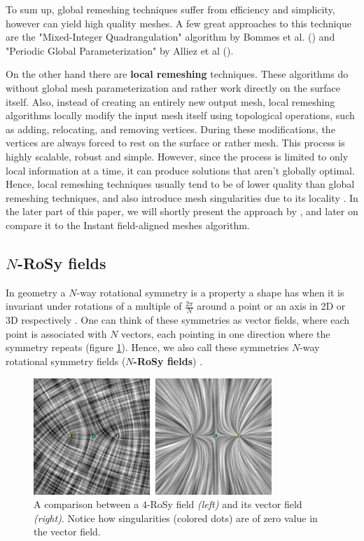 \documentclass{ACGSeminar}
\begin{document}
To sum up, global remeshing techniques suffer from efficiency and simplicity, however can yield high quality meshes. A few great approaches to this technique are the "Mixed-Integer Quadrangulation" algorithm by Bommes et al. (\cite{bommes2009mixed}) and "Periodic Global Parameterization" by Alliez et al (\cite{ray2006periodic}).\bigskip

On the other hand there are \textbf{local remeshing} techniques. These algorithms do without global mesh parameterization and rather work directly on the surface itself. Also, instead of creating an entirely new output mesh, local remeshing algorithms locally modify the input mesh itself using topological operations, such as adding, relocating, and removing vertices. During these modifications, the vertices are always forced to rest on the surface or rather mesh. This process is highly scalable, robust and simple. However, since the process is limited to only local information at a time, it can produce solutions that aren't globally optimal. Hence, local remeshing techniques usually tend to be of lower quality than global remeshing techniques, and also introduce mesh singularities due to its locality \cite{jakob2015instant,alliez2008recent}. In the later part of this paper, we will shortly present the approach by \cite{tarini2010practical}, and later on compare it to the Instant field-aligned meshes algorithm.


\subsection{$N$-RoSy fields}\label{rosy}
In geometry a $N$-way rotational symmetry is a property a shape has when it is invariant under rotations of a multiple of $\frac{2\pi}{N}$ around a point or an axis in 2D or 3D respectively \cite{palacios2007rotational}. One can think of these symmetries as vector fields, where each point is associated with $N$ vectors, each pointing in one direction where the symmetry repeats (figure \ref{fig:n-rosy-singularities}). Hence, we also call these symmetries $N$-way rotational symmetry fields (\textbf{$N$-RoSy fields}) \cite{panozzo2012fields}.

\begin{figure}[htb!]
	\begin{centering}
		\includegraphics[width=9cm]{img/n-Rosy-Singularity.png}\par
	\end{centering}
	\caption{A comparison between a $4$-RoSy field \textit{(left)} and its vector field \textit{(right)}. Notice how singularities (colored dots) are of zero value in the vector field. \cite{palacios2007rotational}}
	\label{fig:n-rosy-singularities}
\end{figure}
\end{document}
